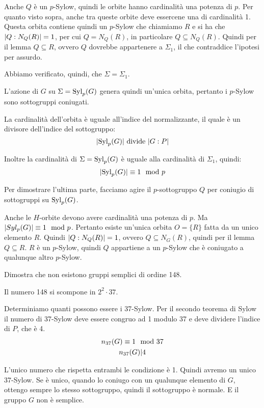 \begin{dimostrazione}
    Anche $Q$ è un $p$-Sylow, quindi le orbite hanno cardinalità una potenza di $p$.
    Per quanto visto sopra, anche tra queste orbite deve essercene una di cardinalità 1.
    Questa orbita contiene quindi un $p$-Sylow che chiamiamo $R$ e si ha che $\lvert Q:N_Q(R) \rvert = 1$,
    per cui $Q = N_Q(R)$, in particolare $Q \subseteq N_Q(R)$.
    Quindi per il lemma $Q \subseteq R$, ovvero $Q$ dovrebbe appartenere a $\Sigma_1$, il che contraddice l'ipotesi
    per assurdo.

    Abbiamo verificato, quindi, che $\Sigma = \Sigma_1$.

    L'azione di $G$ su $\Sigma = \operatorname{Syl}_p(G)$ genera quindi un'unica orbita, pertanto i $p$-Sylow sono sottogruppi
    coniugati.

    La cardinalità dell'orbita è uguale all'indice del normalizzante, il quale è un divisore dell'indice del sottogruppo:
    \begin{equation*}
        \lvert \operatorname{Syl}_p(G) \rvert \text{ divide } \lvert G:P \rvert
    \end{equation*}

    Inoltre la cardinalità di $\Sigma = \operatorname{Syl}_p(G)$ è uguale alla cardinalità di $\Sigma_1$, quindi:
    \begin{equation*}
        \lvert \operatorname{Syl}_p(G) \rvert \equiv 1 \mod p
    \end{equation*}

    Per dimostrare l'ultima parte, facciamo agire il $p$-sottogruppo $Q$ per coniugio di sottogruppi su $\operatorname{Syl}_p(G)$.

    Anche le $H$-orbite devono avere cardinalità una potenza di $p$.
    Ma $\lvert Syl_p(G) \rvert \equiv 1 \mod p$.
    Pertanto esiste un'unica orbita $O = \{R\}$ fatta da un unico elemento $R$.
    Quindi $\lvert Q:N_Q(R) \rvert = 1$, ovvero $Q \subseteq N_G(R)$, quindi per il lemma $Q \subseteq R$.
    $R$ è un $p$-Sylow, quindi $Q$ appartiene a un $p$-Sylow che è coniugato a qualunque altro $p$-Sylow.
\end{dimostrazione}

\begin{esercizio}
    Dimostra che non esistono gruppi semplici di ordine 148.
\end{esercizio}
\begin{soluzione}
    Il numero 148 si scompone in $2^2 \cdot 37$.

    Determiniamo quanti possono essere i 37-Sylow.
    Per il secondo teorema di Sylow il numero di 37-Sylow deve essere congruo ad 1 modulo 37 e deve dividere l'indice
    di $P$, che è 4.
    \begin{gather*}
        n_{37}(G) \equiv 1 \mod 37 \\
        n_{37}(G) | 4
    \end{gather*}

    L'unico numero che rispetta entrambi le condizione è 1.
    Quindi avremo un unico 37-Sylow.
    Se è unico, quando lo coniugo con un qualunque elemento di $G$, ottengo sempre lo stesso sottogruppo, quindi il
    sottogruppo è normale.
    E il gruppo $G$ non è semplice.
\end{soluzione}

